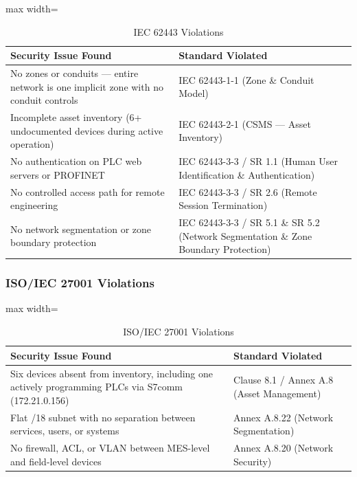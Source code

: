 \begin{table}[H]
\centering
\begin{adjustbox}{max width=\textwidth}
\begin{tabular}{@{}p{}p{}@{}}
\toprule
\textbf{Security Issue Found} & \textbf{Standard Violated} \\
\midrule
No zones or conduits — entire network is one implicit zone with no conduit controls & IEC 62443-1-1 (Zone \& Conduit Model) \\
Incomplete asset inventory (6+ undocumented devices during active operation) & IEC 62443-2-1 (CSMS — Asset Inventory) \\
No authentication on PLC web servers or PROFINET & IEC 62443-3-3 / SR 1.1 (Human User Identification \& Authentication) \\
No controlled access path for remote engineering & IEC 62443-3-3 / SR 2.6 (Remote Session Termination) \\
No network segmentation or zone boundary protection & IEC 62443-3-3 / SR 5.1 \& SR 5.2 (Network Segmentation \& Zone Boundary Protection) \\
\bottomrule
\end{tabular}
\end{adjustbox}
\caption{IEC 62443 Violations}
\end{table}

\subsubsection{ISO/IEC 27001 Violations}

\begin{table}[H]
\centering
\begin{adjustbox}{max width=\textwidth}
\begin{tabular}{@{}p{}p{}@{}}
\toprule
\textbf{Security Issue Found} & \textbf{Standard Violated} \\
\midrule
Six devices absent from inventory, including one actively programming PLCs via S7comm (172.21.0.156) & Clause 8.1 / Annex A.8 (Asset Management) \\
Flat /18 subnet with no separation between services, users, or systems & Annex A.8.22 (Network Segmentation) \\
No firewall, ACL, or VLAN between MES-level and field-level devices & Annex A.8.20 (Network Security) \\
\bottomrule
\end{tabular}
\end{adjustbox}
\caption{ISO/IEC 27001 Violations}
\end{table}

